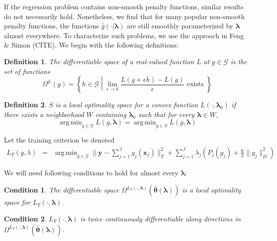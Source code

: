 \documentclass[12pt]{article}
\newtheorem{definition}{Definition}
\newtheorem{condition}{Condition}
\DeclareMathOperator*{\argmin}{arg\,min}
\begin{document}
If the regression problem contains non-smooth penalty functions, similar results do not necessarily hold. Nonetheless, we find that for many popular non-smooth penalty functions, the functions $\hat{g}(\cdot | \boldsymbol \lambda)$ are still smoothly parameterized by $\boldsymbol \lambda$ almost everywhere. To characterize such problems, we use the approach in Feng \& Simon (CITE). We begin with the following definitions:

\begin{definition}
The differentiable space of a real-valued function $L$ at $g \in \mathcal{G}$ is the set of functions
\begin{equation}
\Omega^{L}(g) = \left \{ h \in \mathcal{G} \middle | \lim_{\epsilon \rightarrow 0} \frac{L(g + \epsilon h) - L(g)}{\epsilon} \text{ exists } \right \}
\end{equation}
\end{definition}

\begin{definition}
$S$ is a local optimality space for a convex function $L(\cdot, \boldsymbol \lambda_0)$ if there exists a neighborhood $W$ containing $\boldsymbol \lambda_0$ such that for every $\boldsymbol \lambda \in W$,
\begin{equation}
\argmin_{g \in \mathcal{G}} L(g, \boldsymbol \lambda) =
\argmin_{g \in S} L(g, \boldsymbol \lambda)
\end{equation}
\end{definition}

Let the training criterion be denoted
\begin{eqnarray*}
L_T(g, \lambda) &=& \argmin_{g\in \mathcal{G}} \| \boldsymbol y -  \sum_{j=1}^J g_j(\boldsymbol x_j) \|^2_T + \sum_{j=1}^J \lambda_j \left ( P_j(g_j) + \frac{w}{2} \| g_j \|^2_D \right )
\end{eqnarray*}

We will need following conditions to hold for almost every $\boldsymbol{\lambda}$:
\begin{condition}
\label{condn:nonsmooth1}
The differentiable space $\Omega^{L_T(\cdot, \boldsymbol{\lambda})}(\hat{\boldsymbol \theta}\left(\boldsymbol{\lambda}\right))$ is a local optimality space for $L_T\left(\cdot,\boldsymbol{\lambda}\right)$.
\end{condition}
\begin{condition}
\label{condn:nonsmooth2}
$L_T(\cdot, \boldsymbol{\lambda})$ is twice continuously differentiable along directions in $\Omega^{L_T(\cdot, \boldsymbol{\lambda})}(\hat{\boldsymbol \theta}\left(\boldsymbol{\lambda}\right))$. 
\end{condition}
\end{document}
